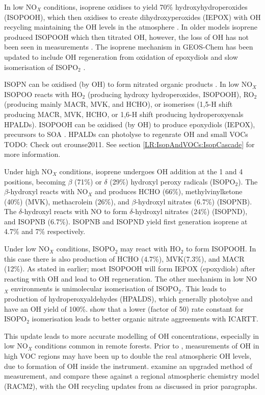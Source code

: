     In low NO$_X$ conditions, isoprene oxidises to yield 70\% hydroxyhydroperoxides (ISOPOOH), which then oxidises to create dihydroxyperoxides (IEPOX) with OH recycling maintaining the OH levels in the atmosphere \citep{Paulot2009b}.
    In older models isoprene produced ISOPOOH which then titrated OH, however, the loss of OH has not been seen in measurements \citep{Paulot2009b,Mao2013}.
    The isoprene mechanism in GEOS-Chem has been updated to include OH regeneration from oxidation of epoxydiols and slow isomerisation of ISOPO$_2$ \citep{Mao2013}.
    
    ISOPN can be oxidised (by OH) to form nitrated organic products \citep{Paulot2009a}.
    In low NO$_X$ ISOPOO reacts with HO$_2$ (producing hydroxy hydroperoxides, ISOPOOH), RO$_2$ (producing mainly MACR, MVK, and HCHO), or isomerises (1,5-H shift producing MACR, MVK, HCHO, or 1,6-H shift producing hydroperoxyenals HPALDs). 
    ISOPOOH can be oxidised (by OH) to produce epoxydiols (IEPOX), precursors to SOA \citep{Paulot2009b}. 
    HPALDs can photolyse to regenrate OH and small VOCs \citep{Crounse2011,Wolfe2012, Peeters2014} TODO: Check out crounse2011.
    See section \ref{LR:IsopAndVOCs:IsopCascade} for more information.
    
    Under high NO$_X$ conditions, isoprene undergoes OH addition at the 1 and 4 positions, becoming $\beta$ (71\%) or $\delta$ (29\%) hydroxyl peroxy radicals (ISOPO$_2$). 
    The $\beta$-hydroxyl reacts with NO$_X$ and produces HCHO (66\%), methylvinylketone (40\%) (MVK), methacrolein (26\%), and $\beta$-hydroxyl nitrates (6.7\%) (ISOPNB).
    The $\delta$-hydroxyl reacts with NO to form $\delta$-hydroxyl nitrates (24\%) (ISOPND), and ISOPNB (6.7\%).
    ISOPNB and ISOPND yield first generation isoprene at 4.7\% and 7\% respectively.
    
    Under low NO$_X$ conditions, ISOPO$_2$ may react with HO$_2$ to form ISOPOOH.
    In this case there is also production of HCHO (4.7\%), MVK(7.3\%), and MACR (12\%).
    As stated in earlier; most ISOPOOH will form IEPOX (epoxydiols) after reacting with OH and lead to OH regeneration.
    The other mechanism in low NO$_X$ environments is unimolecular isomerisation of ISOPO$_2$.
    This leads to production of hydroperoxyaldehydes (HPALDS), which generally photolyse and have an OH yield of 100\%.
    \citet{Mao2013} show that a lower (factor of 50) rate constant for ISOPO$_2$ isomerisation leads to better organic nitrate aggreements with ICARTT. 
    
    This update leads to more accurate modelling of OH concentrations, especially in low NO$_X$ conditions common in remote forests.
    Prior to \citet{Mao2012}, measurements of OH in high VOC regions may have been up to double the real atmospheric OH levels, due to formation of OH inside the instrument.
    \citet{Mao2012} examine an upgraded method of measurement, and compare these against a regional atmospheric chemistry model (RACM2), with the OH recycling updates from \citet{Paulot2009b} as discussed in prior paragraphs.
    
